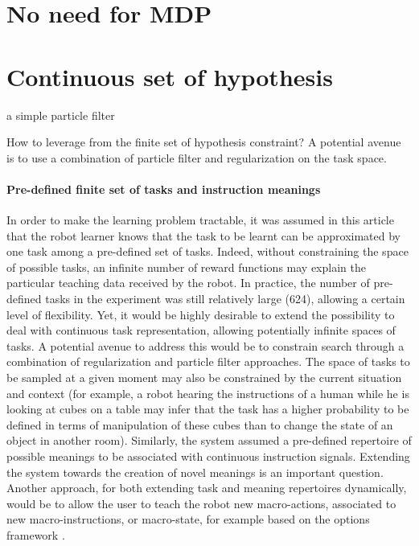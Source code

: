 \section{No need for MDP}


\section{Continuous set of hypothesis}
\label{chapter:limitations:continoushypothesis}

a simple particle filter

How to leverage from the finite set of hypothesis constraint? A potential avenue is to use a combination of particle filter and regularization on the task space.

\paragraph{Pre-defined finite set of tasks and instruction meanings} In order to make the learning problem tractable, it was assumed in this article that the robot learner knows that the task to be learnt can be approximated by one task among a pre-defined set of tasks. Indeed, without constraining the space of possible tasks, an infinite number of reward functions may explain the particular teaching data received by the robot. In practice, the number of pre-defined tasks in the experiment was still relatively large (624), allowing a certain level of flexibility. Yet, it would be highly desirable to extend the possibility to deal with continuous task representation, allowing potentially infinite spaces of tasks. A potential avenue to address this would be to constrain search through a combination of regularization and particle filter approaches. The space of tasks to be sampled at a given moment may also be constrained by the current situation and context (for example, a robot hearing the instructions of a human while he is looking at cubes on a table may infer that the task has a higher probability to be defined in terms of manipulation of these cubes than to change the state of an object in another room). Similarly, the system assumed a pre-defined repertoire of possible meanings to be associated with continuous instruction signals. Extending the system towards the creation of novel meanings is an important question. Another approach, for both extending task and meaning repertoires dynamically, would be to allow the user to teach the robot new macro-actions, associated to new macro-instructions, or macro-state, for example based on the options framework \cite{sutton1999between}.




